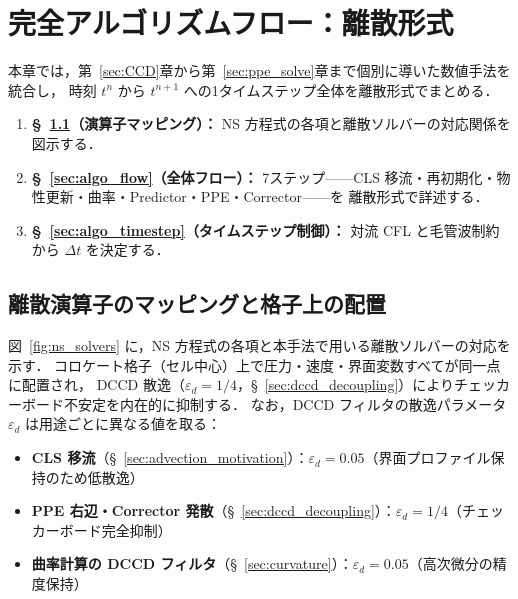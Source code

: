 \section{完全アルゴリズムフロー：離散形式}
\label{sec:algorithm}

本章では，第~\ref{sec:CCD}章から第~\ref{sec:ppe_solve}章まで個別に導いた数値手法を統合し，
時刻 $t^n$ から $t^{n+1}$ への1タイムステップ全体を離散形式でまとめる．

\begin{enumerate}
  \item \textbf{§~\ref{sec:algo_operator_map}（演算子マッピング）：}
        NS 方程式の各項と離散ソルバーの対応関係を図示する．
  \item \textbf{§~\ref{sec:algo_flow}（全体フロー）：}
        7ステップ——CLS 移流・再初期化・物性更新・曲率・Predictor・PPE・Corrector——を
        離散形式で詳述する．
  \item \textbf{§~\ref{sec:algo_timestep}（タイムステップ制御）：}
        対流 CFL と毛管波制約から $\Delta t$ を決定する．
\end{enumerate}

\subsection{離散演算子のマッピングと格子上の配置}
\label{sec:algo_operator_map}

図~\ref{fig:ns_solvers} に，NS 方程式の各項と本手法で用いる離散ソルバーの対応を示す．
コロケート格子（セル中心）上で圧力・速度・界面変数すべてが同一点に配置され，
DCCD 散逸（$\varepsilon_d=1/4$，§~\ref{sec:dccd_decoupling}）によりチェッカーボード不安定を内在的に抑制する．
なお，DCCD フィルタの散逸パラメータ $\varepsilon_d$ は用途ごとに異なる値を取る：
\begin{itemize}[noitemsep]
  \item \textbf{CLS 移流}（§~\ref{sec:advection_motivation}）：$\varepsilon_d = 0.05$（界面プロファイル保持のため低散逸）
  \item \textbf{PPE 右辺・Corrector 発散}（§~\ref{sec:dccd_decoupling}）：$\varepsilon_d = 1/4$（チェッカーボード完全抑制）
  \item \textbf{曲率計算の DCCD フィルタ}（§~\ref{sec:curvature}）：$\varepsilon_d = 0.05$（高次微分の精度保持）
\end{itemize}


